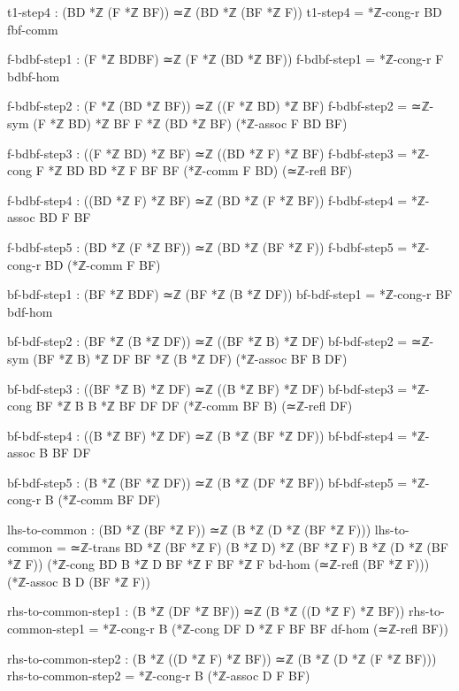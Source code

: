 \documentclass[11pt,a4paper]{book}
\begin{document}
\begin{code}
        t1-step4 : (BD *ℤ (F *ℤ BF)) ≃ℤ (BD *ℤ (BF *ℤ F))
        t1-step4 = *ℤ-cong-r BD fbf-comm

        
        f-bdbf-step1 : (F *ℤ BDBF) ≃ℤ (F *ℤ (BD *ℤ BF))
        f-bdbf-step1 = *ℤ-cong-r F bdbf-hom
        
        f-bdbf-step2 : (F *ℤ (BD *ℤ BF)) ≃ℤ ((F *ℤ BD) *ℤ BF)
        f-bdbf-step2 = ≃ℤ-sym {(F *ℤ BD) *ℤ BF} {F *ℤ (BD *ℤ BF)} (*ℤ-assoc F BD BF)
        
        f-bdbf-step3 : ((F *ℤ BD) *ℤ BF) ≃ℤ ((BD *ℤ F) *ℤ BF)
        f-bdbf-step3 = *ℤ-cong {F *ℤ BD} {BD *ℤ F} {BF} {BF} (*ℤ-comm F BD) (≃ℤ-refl BF)
        
        f-bdbf-step4 : ((BD *ℤ F) *ℤ BF) ≃ℤ (BD *ℤ (F *ℤ BF))
        f-bdbf-step4 = *ℤ-assoc BD F BF
        
        f-bdbf-step5 : (BD *ℤ (F *ℤ BF)) ≃ℤ (BD *ℤ (BF *ℤ F))
        f-bdbf-step5 = *ℤ-cong-r BD (*ℤ-comm F BF)
        
        bf-bdf-step1 : (BF *ℤ BDF) ≃ℤ (BF *ℤ (B *ℤ DF))
        bf-bdf-step1 = *ℤ-cong-r BF bdf-hom
        
        bf-bdf-step2 : (BF *ℤ (B *ℤ DF)) ≃ℤ ((BF *ℤ B) *ℤ DF)
        bf-bdf-step2 = ≃ℤ-sym {(BF *ℤ B) *ℤ DF} {BF *ℤ (B *ℤ DF)} (*ℤ-assoc BF B DF)
        
        bf-bdf-step3 : ((BF *ℤ B) *ℤ DF) ≃ℤ ((B *ℤ BF) *ℤ DF)
        bf-bdf-step3 = *ℤ-cong {BF *ℤ B} {B *ℤ BF} {DF} {DF} (*ℤ-comm BF B) (≃ℤ-refl DF)
        
        bf-bdf-step4 : ((B *ℤ BF) *ℤ DF) ≃ℤ (B *ℤ (BF *ℤ DF))
        bf-bdf-step4 = *ℤ-assoc B BF DF
        
        bf-bdf-step5 : (B *ℤ (BF *ℤ DF)) ≃ℤ (B *ℤ (DF *ℤ BF))
        bf-bdf-step5 = *ℤ-cong-r B (*ℤ-comm BF DF)
        
        lhs-to-common : (BD *ℤ (BF *ℤ F)) ≃ℤ (B *ℤ (D *ℤ (BF *ℤ F)))
        lhs-to-common = ≃ℤ-trans {BD *ℤ (BF *ℤ F)} {(B *ℤ D) *ℤ (BF *ℤ F)} {B *ℤ (D *ℤ (BF *ℤ F))}
                         (*ℤ-cong {BD} {B *ℤ D} {BF *ℤ F} {BF *ℤ F} bd-hom (≃ℤ-refl (BF *ℤ F)))
                         (*ℤ-assoc B D (BF *ℤ F))

        rhs-to-common-step1 : (B *ℤ (DF *ℤ BF)) ≃ℤ (B *ℤ ((D *ℤ F) *ℤ BF))
        rhs-to-common-step1 = *ℤ-cong-r B (*ℤ-cong {DF} {D *ℤ F} {BF} {BF} df-hom (≃ℤ-refl BF))
        
        rhs-to-common-step2 : (B *ℤ ((D *ℤ F) *ℤ BF)) ≃ℤ (B *ℤ (D *ℤ (F *ℤ BF)))
        rhs-to-common-step2 = *ℤ-cong-r B (*ℤ-assoc D F BF)
        

\end{code}
\end{document}
